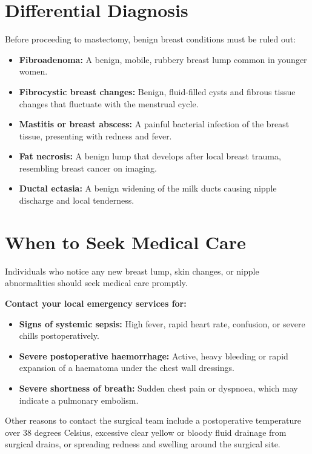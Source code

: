 \section*{Differential Diagnosis}
Before proceeding to mastectomy, benign breast conditions must be ruled out:
\begin{itemize}
    \item \textbf{Fibroadenoma:} A benign, mobile, rubbery breast lump common in younger women.
    \item \textbf{Fibrocystic breast changes:} Benign, fluid-filled cysts and fibrous tissue changes that fluctuate with the menstrual cycle.
    \item \textbf{Mastitis or breast abscess:} A painful bacterial infection of the breast tissue, presenting with redness and fever.
    \item \textbf{Fat necrosis:} A benign lump that develops after local breast trauma, resembling breast cancer on imaging.
    \item \textbf{Ductal ectasia:} A benign widening of the milk ducts causing nipple discharge and local tenderness.
\end{itemize}

\section*{When to Seek Medical Care}
Individuals who notice any new breast lump, skin changes, or nipple abnormalities should seek medical care promptly.

\textbf{Contact your local emergency services for:}
\begin{itemize}
    \item \textbf{Signs of systemic sepsis:} High fever, rapid heart rate, confusion, or severe chills postoperatively.
    \item \textbf{Severe postoperative haemorrhage:} Active, heavy bleeding or rapid expansion of a haematoma under the chest wall dressings.
    \item \textbf{Severe shortness of breath:} Sudden chest pain or dyspnoea, which may indicate a pulmonary embolism.
\end{itemize}
Other reasons to contact the surgical team include a postoperative temperature over 38 degrees Celsius, excessive clear yellow or bloody fluid drainage from surgical drains, or spreading redness and swelling around the surgical site.

